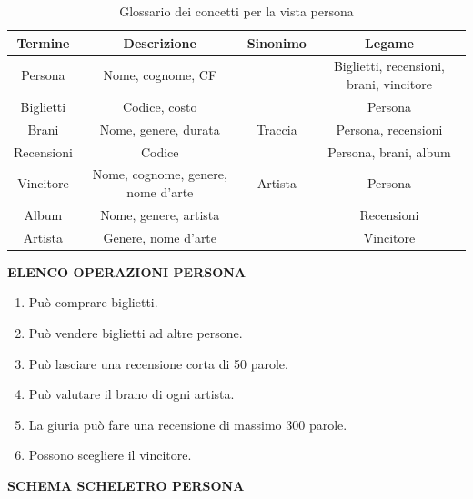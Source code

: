 \documentclass{article}
\begin{document}
\begin{table}[h]
    \centering
    \begin{tabular}{|c|c|c|c|}
        \hline
         \textbf{Termine} & \textbf{Descrizione}  & \textbf{Sinonimo} & \textbf{Legame} \\
         \hline
         Persona & Nome, cognome, CF &  & Biglietti, recensioni, brani, vincitore \\
         \hline
      Biglietti&Codice, costo &  &Persona \\
         \hline
         Brani&Nome, genere, durata  &Traccia  &Persona, recensioni \\
         \hline
         Recensioni&Codice  &  &Persona, brani, album \\
         \hline
         Vincitore&Nome, cognome, genere, nome d'arte  &Artista  &Persona \\
         \hline
         Album&Nome, genere, artista  &  &Recensioni \\
         \hline
         Artista&Genere, nome d'arte &  &Vincitore \\
         \hline
    \end{tabular}
    \caption{Glossario dei concetti per la vista persona}
    \label{tab:my_label}
\end{table}

\newpage
\noindent\textbf{ELENCO OPERAZIONI PERSONA}
\begin{enumerate}
\item Può comprare biglietti.
\item Può vendere biglietti ad altre persone.
\item Può lasciare una recensione corta di 50 parole.
\item Può valutare il brano di ogni artista.
\item La giuria può fare una recensione di massimo 300 parole.
\item Possono scegliere il vincitore.
\newline\newline
\end {enumerate}

\noindent\textbf{SCHEMA SCHELETRO PERSONA}
\end{document}
